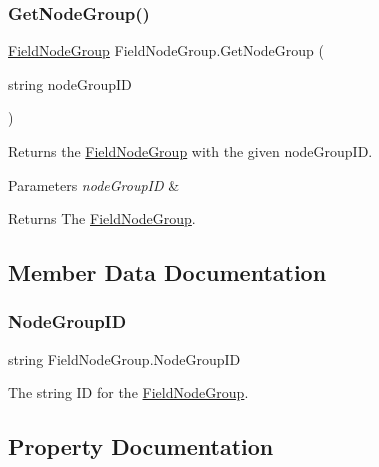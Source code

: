 \subsubsection{\texorpdfstring{Get\+Node\+Group()}{GetNodeGroup()}}
{\footnotesize\ttfamily \hyperlink{class_field_node_group}{Field\+Node\+Group} Field\+Node\+Group.\+Get\+Node\+Group (\begin{DoxyParamCaption}\item[{string}]{node\+Group\+ID }\end{DoxyParamCaption})}



Returns the \hyperlink{class_field_node_group}{Field\+Node\+Group} with the given node\+Group\+ID. 


\begin{DoxyParams}{Parameters}
{\em node\+Group\+ID} & \\
\hline
\end{DoxyParams}
\begin{DoxyReturn}{Returns}
The \hyperlink{class_field_node_group}{Field\+Node\+Group}.
\end{DoxyReturn}


\subsection{Member Data Documentation}
\mbox{\label{class_field_node_group_ae9d21e6b498f2410b5a3c09f9bf3a0e8}} 
\subsubsection{\texorpdfstring{Node\+Group\+ID}{NodeGroupID}}
{\footnotesize\ttfamily string Field\+Node\+Group.\+Node\+Group\+ID}



The string ID for the \hyperlink{class_field_node_group}{Field\+Node\+Group}. 



\subsection{Property Documentation}
\mbox{\label{class_field_node_group_a1d794aecafdb53386c2bbe91d3df805e}} 
